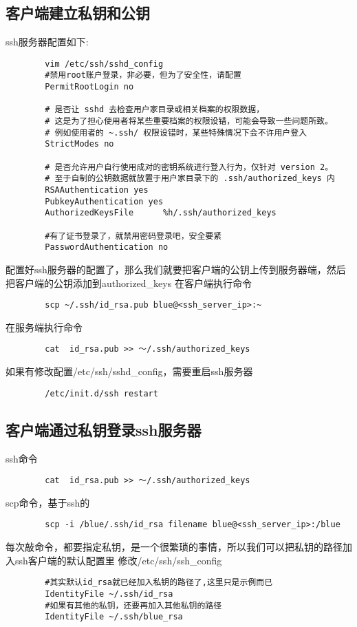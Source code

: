 \documentclass[a4paper,left=1.5cm,right=1.5cm,11pt]{article}
\begin{document}
\subsection{客户端建立私钥和公钥}
	ssh服务器配置如下:
	\begin{lstlisting}
		vim /etc/ssh/sshd_config
		#禁用root账户登录，非必要，但为了安全性，请配置
		PermitRootLogin no

		# 是否让 sshd 去检查用户家目录或相关档案的权限数据，
		# 这是为了担心使用者将某些重要档案的权限设错，可能会导致一些问题所致。
		# 例如使用者的 ~.ssh/ 权限设错时，某些特殊情况下会不许用户登入
		StrictModes no

		# 是否允许用户自行使用成对的密钥系统进行登入行为，仅针对 version 2。
		# 至于自制的公钥数据就放置于用户家目录下的 .ssh/authorized_keys 内
		RSAAuthentication yes
		PubkeyAuthentication yes
		AuthorizedKeysFile      %h/.ssh/authorized_keys

		#有了证书登录了，就禁用密码登录吧，安全要紧
		PasswordAuthentication no
	\end{lstlisting}
	配置好ssh服务器的配置了，那么我们就要把客户端的公钥上传到服务器端，然后把客户端的公钥添加到authorized_keys
	在客户端执行命令
	\begin{lstlisting}
		scp ~/.ssh/id_rsa.pub blue@<ssh_server_ip>:~
	\end{lstlisting}
	在服务端执行命令
	\begin{lstlisting}
		cat  id_rsa.pub >> ～/.ssh/authorized_keys
	\end{lstlisting}
	如果有修改配置/etc/ssh/sshd_config，需要重启ssh服务器
	\begin{lstlisting}
		/etc/init.d/ssh restart
	\end{lstlisting}
\subsection{客户端通过私钥登录ssh服务器}
	ssh命令
	\begin{lstlisting}
		cat  id_rsa.pub >> ～/.ssh/authorized_keys
	\end{lstlisting}
	scp命令，基于ssh的
	\begin{lstlisting}
		scp -i /blue/.ssh/id_rsa filename blue@<ssh_server_ip>:/blue
	\end{lstlisting}
	每次敲命令，都要指定私钥，是一个很繁琐的事情，所以我们可以把私钥的路径加入ssh客户端的默认配置里
	修改/etc/ssh/ssh_config
	\begin{lstlisting}
		#其实默认id_rsa就已经加入私钥的路径了,这里只是示例而已
		IdentityFile ~/.ssh/id_rsa
		#如果有其他的私钥，还要再加入其他私钥的路径
		IdentityFile ~/.ssh/blue_rsa
	\end{lstlisting}
\end{document}
